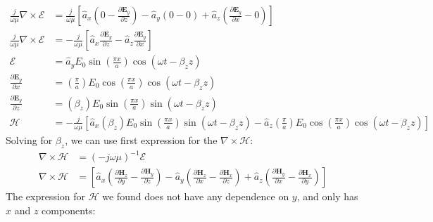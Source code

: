 \documentclass[12pt]{article}
\begin{document}
\begin{align*}
  \frac{j}{\omega\mu}  \nabla \times \bm{\mathcal{E}} &=  \frac{j}{\omega\mu} \left[\hat a_x\left(0 - \frac{\partial\bm{E}_y}{\partial z}\right) - \hat a_y\left( 0 - 0  \right) + \hat a_z\left( \frac{\partial\bm{E}_y}{\partial x} -  0\right)\right] \\
  \frac{j}{\omega\mu}  \nabla \times \bm{\mathcal{E}} &=  -\frac{j}{\omega\mu} \left[\hat a_x \frac{\partial\bm{E}_y}{\partial z} - \hat a_z \frac{\partial\bm{E}_y}{\partial x}\right]\\
  \bm{\mathcal{E}} &= \hat{a}_y E_0 \sin\left(\frac{\pi x}{a}\right) \cos(\omega t - \beta_z z)\\
  \frac{\partial\bm{E}_y}{\partial x} &= \left( \frac{\pi}{a}\right) E_0 \cos\left(\frac{\pi x}{a}\right)\cos(\omega t - \beta_z z) \\
  \frac{\partial\bm{E}_y}{\partial z} &= \left( \beta_z\right) E_0 \sin\left(\frac{\pi x}{a}\right)\sin(\omega t - \beta_z z) \\
  \bm{\mathcal{H}} &= -\frac{j}{\omega\mu} \left[\hat a_x \left( \beta_z\right) E_0 \sin\left(\frac{\pi x}{a}\right)\sin(\omega t - \beta_z z) - \hat a_z \left( \frac{\pi}{a}\right) E_0 \cos\left(\frac{\pi x}{a}\right)\cos(\omega t - \beta_z z)\right]
\end{align*}
Solving for $\beta_z$, we can use first expression for the $\nabla \times \bm{\mathcal{H}}$:
\begin{align*}
  \nabla \times \bm{\mathcal{H}} &= (-j \omega\mu)^{-1} \bm{\mathcal{E}}\\
  \nabla \times \bm{\mathcal{H}} &= \left[\hat a_x\left(\frac{\partial\bm{H}_z}{\partial y} - \frac{\partial\bm{H}_y}{\partial z}\right) - \hat a_y\left( \frac{\partial\bm{H}_z}{\partial x} - \frac{\partial\bm{H}_x}{\partial z}  \right) + \hat a_z\left( \frac{\partial\bm{H}_y}{\partial x} -  \frac{\partial\bm{H}_x}{\partial y}\right)\right]
\end{align*}
\newpage
The expression for $\bm{\mathcal{H}}$ we found does not have any dependence on $y$, and only has $x$ and $z$ components:
\end{document}
